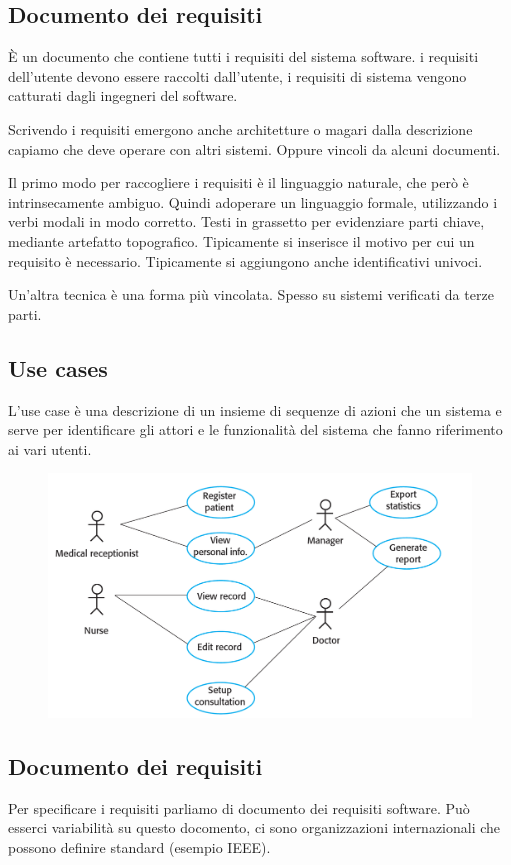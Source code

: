 \subsection{Documento dei requisiti}
È un documento che contiene tutti i requisiti del sistema software.
i requisiti dell'utente devono essere raccolti dall'utente, 
i requisiti di sistema vengono catturati dagli ingegneri del software.

Scrivendo i requisiti emergono anche architetture o magari dalla descrizione 
capiamo che deve operare con altri sistemi. Oppure vincoli da alcuni documenti.

Il primo modo per raccogliere i requisiti è il linguaggio naturale,
che però è intrinsecamente ambiguo. Quindi adoperare un linguaggio formale,
utilizzando i verbi modali in modo corretto. Testi in grassetto per 
evidenziare parti chiave, mediante artefatto topografico.
Tipicamente si inserisce il motivo per cui un requisito è 
necessario. Tipicamente si aggiungono anche identificativi univoci.

Un'altra tecnica è una forma più vincolata. Spesso su sistemi verificati 
da terze parti.

\subsection{Use cases}
L'use case è una descrizione di un insieme di sequenze di azioni che un sistema
e serve per identificare gli attori e le funzionalità del sistema che fanno 
riferimento ai vari utenti.
\begin{figure}[H]
    \centering
    \includegraphics[scale=0.4]{img/usecase.png}
\end{figure}
\subsection{Documento dei requisiti}
Per specificare i requisiti parliamo di documento dei requisiti software.
Può esserci variabilità su questo docomento, ci sono organizzazioni internazionali 
che possono definire standard (esempio IEEE).
